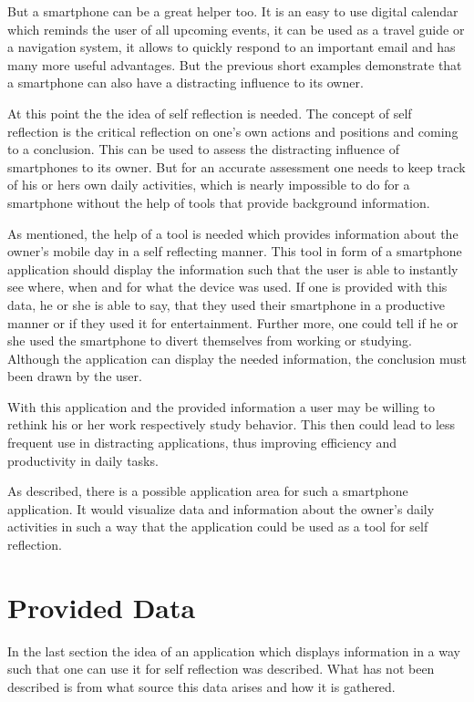 But a smartphone  can be a great helper too. It is an easy to use digital calendar which reminds the user of all upcoming events, it can be used as a travel guide or a navigation system, it allows to quickly respond to an important email and has many more useful advantages. But the previous short examples demonstrate that a smartphone can also have a distracting influence to its owner.

At this point the the idea of self reflection is needed. The concept of self reflection is the critical reflection on one's own actions and positions and coming to a conclusion. This can be used to assess the distracting influence of smartphones to its owner. But for an accurate assessment one needs to keep track of his or hers own daily activities, which is nearly impossible to do for a smartphone without the help of tools that provide background information.

As  mentioned, the help of a tool is needed which provides information about the owner's mobile day in a self reflecting manner. This tool in form of a smartphone application should display the information such that the user is able to instantly see where, when and for what the device was used. If one is provided with this data, he or she is able to say, that they used their smartphone in a productive manner or if they used it for entertainment. Further more, one could tell if he or she used the smartphone to divert themselves from working or studying. Although the application can display the needed information, the conclusion must been drawn by the user.

With  this application and the provided information a user may be willing to rethink his or her work respectively study behavior. This then could lead to less frequent use in distracting applications, thus improving efficiency and productivity in daily tasks.

As described, there is a possible application area for such a smartphone application. It would visualize data and information about the owner's daily activities in such a way that the application could be used as a tool for self reflection.

\newpage
\section{Provided Data}
In the last section the idea of an application which displays information in a way such that one can use it for self reflection was described. What has not been described is from what source this data arises and how it is gathered.

